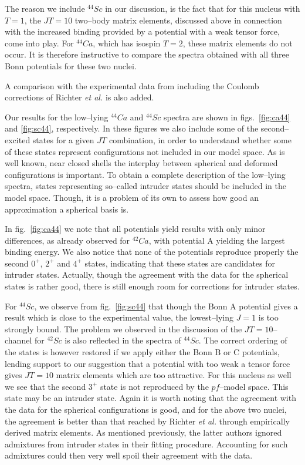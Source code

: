The reason we include $^{44}Sc$ in our discussion, is the fact that
for this nucleus with $T=1$, the $JT=10$ two--body matrix elements, discussed above
in connection with the increased binding provided by a potential
with a weak tensor force, come into play. For $^{44}Ca$, which has
isospin $T=2$, these matrix elements do not occur.
It is therefore instructive to compare the spectra obtained with
all three Bonn potentials for these two nuclei.

A comparison with the experimental data from \cite{endt90}
including the Coulomb corrections of Richter {\em et al.}
\cite{richt91} is also added.



Our results for the low--lying $^{44}Ca$ and $^{44}Sc$ spectra are shown in
figs.\ \ref{fig:ca44} and \ref{fig:sc44}, respectively. In these
figures we also include some of the second--excited states for a given
$JT$ combination, in order to understand whether some of these states
represent configurations not included in our model space. As is well known,
near closed shells the interplay between spherical and deformed
configurations is important. To obtain a complete
description of the low--lying spectra, states representing 
so--called intruder states should be included in the model space. Though,
it is a problem of its own to assess how good an approximation a spherical
basis is.

In fig.\ \ref{fig:ca44}
we note that all potentials yield results with only minor differences, as already
observed for $^{42}Ca$, with potential A yielding the largest binding energy.
We also
notice that none of the potentials reproduce properly
the second $0^+$, $2^+$ and $4^+$ states, indicating that these states
are candidates for intruder states. Actually, though the agreement with the
data for the spherical states is rather good, there is still enough room
for corrections for intruder states.


For $^{44}Sc$, we observe from fig.\ \ref{fig:sc44} that though the Bonn A
potential gives a result which is close to the experimental value, the
lowest--lying $J=1$ is too strongly bound. The problem we observed in the
discussion of the $JT=10$--channel for $^{42}Sc$ is also reflected
in the spectra of $^{44}Sc$. The correct ordering of the states is however
restored if we apply either the Bonn B or C potentials, lending support
to our suggestion that a potential with too weak a tensor force gives
$JT=10$ matrix elements which are too attractive.
For this nucleus as well we see that the second $3^+$ state is not reproduced
by the $pf$--model space. This state may be  an intruder state.
Again it is worth noting that the agreement with the data for the spherical
configurations is good, and for the above two nuclei, the agreement is better
than that reached by Richter {\em et al.} \cite{richt91}
through empirically derived
matrix elements. As mentioned previously, the latter authors ignored
admixtures from intruder states in their fitting procedure. Accounting
for such admixtures could then very well spoil their agreement
with the data.



